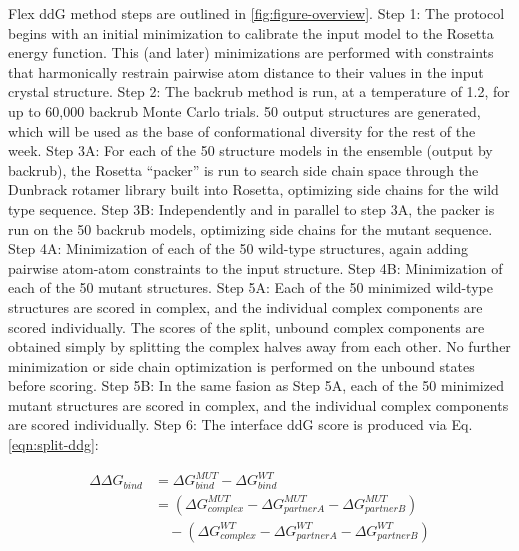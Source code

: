 Flex ddG method steps are outlined in \cref{fig:figure-overview}.
Step 1: The protocol begins with an initial minimization to calibrate the input model to the Rosetta energy function. This (and later) minimizations are performed with constraints that harmonically restrain pairwise atom distance to their values in the input crystal structure.
Step 2: The backrub method is run, at a temperature of 1.2, for up to 60,000 backrub Monte Carlo trials. 50 output structures are generated, which will be used as the base of conformational diversity for the rest of the week.
Step 3A: For each of the 50 structure models in the ensemble (output by backrub), the Rosetta ``packer'' is run to search side chain space through the Dunbrack rotamer library built into Rosetta\cite{shapovalov_smoothed_2011}, optimizing side chains for the wild type sequence.
Step 3B: Independently and in parallel to step 3A, the packer is run on the 50 backrub models, optimizing side chains for the mutant sequence. Step 4A: Minimization of each of the 50 wild-type structures, again adding pairwise atom-atom constraints to the input structure.
Step 4B: Minimization of each of the 50 mutant structures.
Step 5A: Each of the 50 minimized wild-type structures are scored in complex, and the individual complex components are scored individually. The scores of the split, unbound complex components are obtained simply by splitting the complex halves away from each other. No further minimization or side chain optimization is performed on the unbound states before scoring.
Step 5B: In the same fasion as Step 5A, each of the 50 minimized mutant structures are scored in complex, and the individual complex components are scored individually. Step 6: The interface ddG score is produced via Eq. \ref{eqn:split-ddg}:

\begin{equation}\label{eqn:split-ddg}
  \begin{split}
    {\Delta\Delta}G_{bind} & ={\Delta}G^{MUT}_{bind} - {\Delta}G^{WT}_{bind}\\
    & =({\Delta}G^{MUT}_{complex} - {\Delta}G^{MUT}_{partner A} - {\Delta}G^{MUT}_{partner B})\\
    & \quad - ({\Delta}G^{WT}_{complex} - {\Delta}G^{WT}_{partner A} - {\Delta}G^{WT}_{partner B})\\
  \end{split}
\end{equation}

